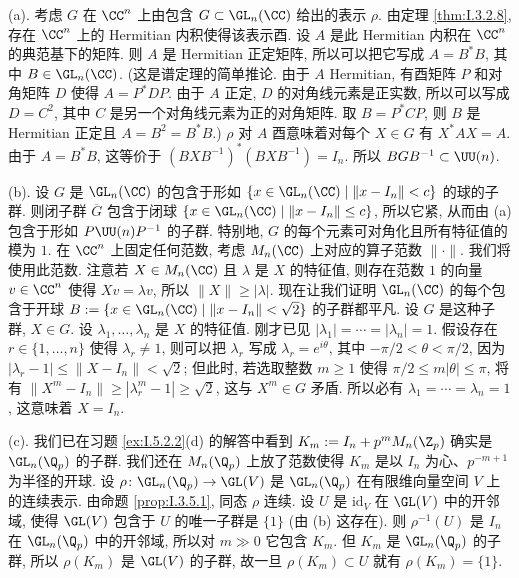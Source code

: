 \begin{solution}
(a). 考虑 $G$ 在 $\CC^n$ 上由包含 $G \subset \GL_n(\CC)$ 给出的表示 $\rho$. 由定理 \ref{thm:I.3.2.8}, 存在 $\CC^n$ 上的 Hermitian 内积使得该表示酉. 设 $A$ 是此 Hermitian 内积在 $\CC^n$ 的典范基下的矩阵. 则 $A$ 是 Hermitian 正定矩阵, 所以可以把它写成 $A = B^*B$, 其中 $B \in \GL_n(\CC)$. (这是谱定理的简单推论. 由于 $A$ Hermitian, 有酉矩阵 $P$ 和对角矩阵 $D$ 使得 $A = P^*DP$. 由于 $A$ 正定, $D$ 的对角线元素是正实数, 所以可以写成 $D = C^2$, 其中 $C$ 是另一个对角线元素为正的对角矩阵. 取 $B = P^*CP$, 则 $B$ 是 Hermitian 正定且 $A = B^2 = B^*B$.)
$\rho$ 对 $A$ 酉意味着对每个 $X \in G$ 有 $X^*AX = A$. 由于 $A = B^*B$, 这等价于 $(BXB^{-1})^*(BXB^{-1}) = I_n$. 所以 $BGB^{-1} \subset \UU(n)$.

(b). 设 $G$ 是 $\GL_n(\CC)$ 的包含于形如 $\{x \in \GL_n(\CC) \mid \|x - I_n\| < c\}$ 的球的子群. 则闭子群 $\overline{G}$ 包含于闭球 $\{x \in \GL_n(\CC) \mid \|x - I_n\| \leq c\}$, 所以它紧, 从而由 (a) 包含于形如 $P\UU(n)P^{-1}$ 的子群. 特别地, $G$ 的每个元素可对角化且所有特征值的模为 $1$.
在 $\CC^n$ 上固定任何范数, 考虑 $M_n(\CC)$ 上对应的算子范数 $\|\cdot\|$. 我们将使用此范数. 注意若 $X \in M_n(\CC)$ 且 $\lambda$ 是 $X$ 的特征值, 则存在范数 $1$ 的向量 $v \in \CC^n$ 使得 $Xv = \lambda v$, 所以 $\|X\| \geq |\lambda|$. 现在让我们证明 $\GL_n(\CC)$ 的每个包含于开球 $B := \{x \in \GL_n(\CC) \mid \|x - I_n\| < \sqrt{2}\}$ 的子群都平凡. 设 $G$ 是这种子群, $X \in G$. 设 $\lambda_1, \ldots, \lambda_n$ 是 $X$ 的特征值. 刚才已见 $|\lambda_1| = \cdots = |\lambda_n| = 1$. 假设存在 $r \in \{1, \ldots, n\}$ 使得 $\lambda_r \neq 1$, 则可以把 $\lambda_r$ 写成 $\lambda_r = e^{i\theta}$, 其中 $-\pi/2 < \theta < \pi/2$, 因为 $|\lambda_r - 1| \leq \|X - I_n\| < \sqrt{2}$; 但此时, 若选取整数 $m \geq 1$ 使得 $\pi/2 \leq m|\theta| \leq \pi$, 将有 $\|X^m - I_n\| \geq |\lambda_r^m - 1| \geq \sqrt{2}$, 这与 $X^m \in G$ 矛盾. 所以必有 $\lambda_1 = \cdots = \lambda_n = 1$, 这意味着 $X = I_n$.

(c). 我们已在习题 \ref{ex:I.5.2.2}(d) 的解答中看到 $K_m := I_n + p^mM_n(\Z_p)$ 确实是 $\GL_n(\Q_p)$ 的子群. 我们还在 $M_n(\Q_p)$ 上放了范数使得 $K_m$ 是以 $I_n$ 为心、$p^{-m+1}$ 为半径的开球.
设 $\rho \colon \GL_n(\Q_p) \to \GL(V)$ 是 $\GL_n(\Q_p)$ 在有限维向量空间 $V$ 上的连续表示. 由命题 \ref{prop:I.3.5.1}, 同态 $\rho$ 连续. 设 $U$ 是 $\mathrm{id}_V$ 在 $\GL(V)$ 中的开邻域, 使得 $\GL(V)$ 包含于 $U$ 的唯一子群是 $\{1\}$ (由 (b) 这存在). 则 $\rho^{-1}(U)$ 是 $I_n$ 在 $\GL_n(\Q_p)$ 中的开邻域, 所以对 $m \gg 0$ 它包含 $K_m$. 但 $K_m$ 是 $\GL_n(\Q_p)$ 的子群, 所以 $\rho(K_m)$ 是 $\GL(V)$ 的子群, 故一旦 $\rho(K_m) \subset U$ 就有 $\rho(K_m) = \{1\}$.


\end{solution}
